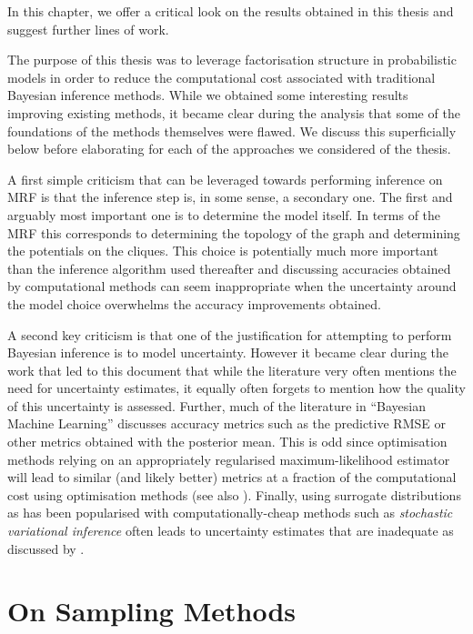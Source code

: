 
In this chapter, we offer a critical look on the results obtained in this thesis and suggest further lines of work.

The purpose of this thesis was to leverage factorisation structure in probabilistic models in order to reduce the computational cost associated with traditional Bayesian inference methods. While we obtained some interesting results improving existing methods, it became clear during the analysis that some of the foundations of the methods themselves were flawed. We discuss this superficially below before elaborating for each of the approaches we considered of the thesis. 

A first simple criticism that can be leveraged towards performing inference on MRF is that the inference step is, in some sense, a secondary one. The first and arguably most important one is to determine the model itself. In terms of the MRF this corresponds to determining the topology of the graph and determining the potentials on the cliques. This choice is potentially much more important than the inference algorithm used thereafter and discussing accuracies obtained by computational methods can seem inappropriate when the uncertainty around the model choice overwhelms the accuracy improvements obtained. 

A second key criticism is that one of the justification for attempting to perform Bayesian inference is to model uncertainty. However it became clear during the work that led to this document that while the literature very often mentions the need for uncertainty estimates, it equally often forgets to mention how the quality of this uncertainty is assessed. Further, much of the literature in ``Bayesian Machine Learning'' discusses accuracy metrics such as the predictive RMSE or other metrics obtained with the posterior mean. This is odd since optimisation methods relying on an appropriately regularised maximum-likelihood estimator will lead to similar (and likely better) metrics at a fraction of the computational cost using optimisation methods (see also \citep{green15}). %
Finally, using surrogate distributions as has been popularised with computationally-cheap methods such as \emph{stochastic variational inference} \citep{hoffman13} often leads to uncertainty estimates that are inadequate as discussed by \cite{wang05}.

\section{On Sampling Methods}

